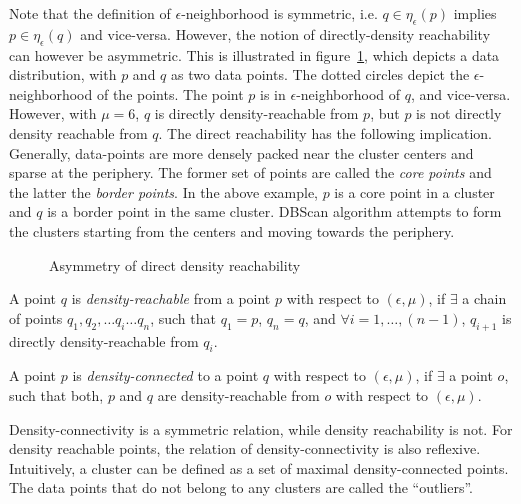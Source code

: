 \noindent
Note that the definition of $\epsilon$-neighborhood is symmetric, i.e. $q \in \eta_{\epsilon}(p)$ implies $p \in \eta_{\epsilon}(q)$ 
and vice-versa.
However, the notion of directly-density reachability can however be asymmetric. This is illustrated in 
figure~\ref{fig:bigdata:direct-density}, which depicts a data distribution, with $p$ and $q$ as two data points. The dotted circles 
depict the $\epsilon$-neighborhood of the points. The point $p$ is in $\epsilon$-neighborhood of $q$, and vice-versa. However, with 
$\mu = 6$, $q$ is directly density-reachable from $p$, but $p$ is not directly density reachable from $q$.
%
 
The direct reachability has the following implication. Generally, data-points are more densely packed near the cluster centers and
sparse at the periphery. The former set of points are called the {\em core points} and the latter the {\em border points}. In the
above example, $p$ is a core point in a cluster and $q$ is a border point in the same cluster. DBScan algorithm attempts to form the 
clusters starting from the centers and moving towards the periphery.

\begin{figure}[htbp!]
	\centerline{
	}
	\caption{Asymmetry of direct density reachability}
	\label{fig:bigdata:direct-density}
\end{figure}

\begin{definition} 
	A point $q$ is {\em density-reachable} from a point $p$ with respect to $(\epsilon,\mu)$, if $\exists$ a chain of points 
	$q_1, q_2, \dots q_i \dots q_n$, such that $q_1 = p$, $q_n = q$, and $\forall i = 1, \dots, (n-1)$, $q_{i+1}$ is directly 
	density-reachable from $q_i$.
\end{definition}

\begin{definition} 
	A point $p$ is {\em density-connected} to a point $q$ with respect to $(\epsilon,\mu)$, if $\exists$ a point $o$, such that 
	both, $p$ and $q$ are density-reachable from $o$ with respect to $(\epsilon,\mu)$. 
\end{definition}
	
\noindent
Density-connectivity is a symmetric relation, while density reachability is not. For density reachable points, the relation of 
density-connectivity is also reflexive. 
%
Intuitively, a cluster can be defined as a set of maximal density-connected points. The data points that do not belong to any clusters
are called the ``outliers''.

